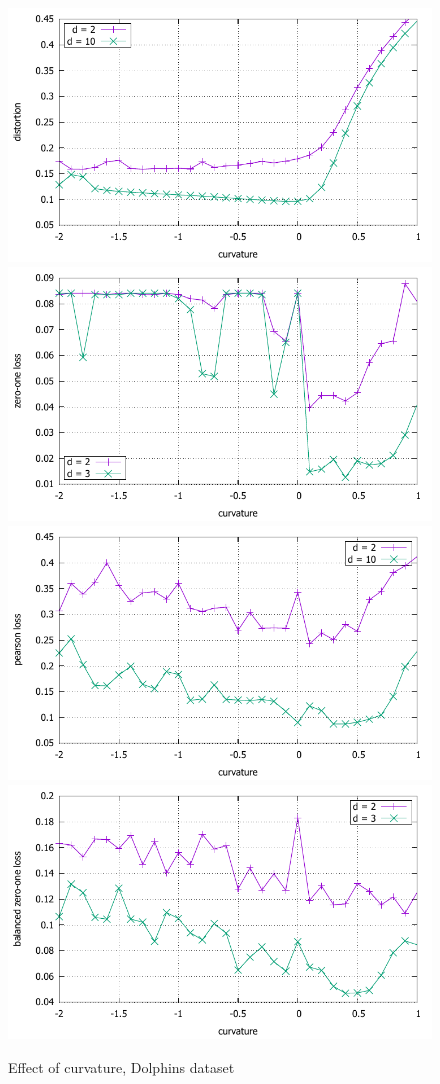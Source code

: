 \documentclass{article} %
\begin{document}
\begin{figure}
    \centering
    \includegraphics[width = 0.49 \textwidth]{dolphins_distortion.pdf}
    \includegraphics[width = 0.49 \textwidth]{dolphins_zero_one.pdf}
    \includegraphics[width = 0.49 \textwidth]{dolphins_pearson.pdf}
    \includegraphics[width = 0.49 \textwidth]{dolphins_balanced_zero_one.pdf}
    \caption{Effect of curvature, Dolphins dataset}
    \label{fig:dolphins}
\end{figure}
\end{document}
